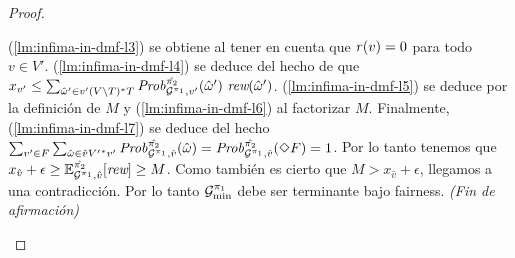 \begin{proof}
\begin{proofofclaim}
    (\ref{lm:infima-in-dmf-l3}) se obtiene al tener en cuenta que $\mathit{r}(v) = 0$ para todo $v \in V'$.
    (\ref{lm:infima-in-dmf-l4}) se deduce del hecho de que 
    $x_{v'} \leq \sum_{\hat{\omega}' \in v' (V \setminus T)^*T}  \MDPProb{\hat{\strat{2}}}_{\StochG^{\strat{1}},v'}(\hat{\omega}')\ \Rewards(\hat{\omega}')$.
    (\ref{lm:infima-in-dmf-l5}) se deduce por la definición de $M$ y
    (\ref{lm:infima-in-dmf-l6}) al factorizar $M$.
    Finalmente, (\ref{lm:infima-in-dmf-l7}) se deduce del hecho 
    $\sum_{v' \in F} \sum_{\hat{\omega} \in \hat{v}{V'}^*v'} \mathit{Prob}^{\hat{\pi_{2}}}_{\mathcal{G}^{\pi_{1}},\hat{v}}(\hat{\omega}) =
    \mathit{Prob}^{\hat{\pi_{2}}}_{\mathcal{G}^{\pi_{1}},\hat{v}} (\Diamond F) = 1$.
    Por lo tanto tenemos que
    $x_{\hat{v}} + \epsilon \geq \mathbb{E}^{\hat{\pi_{2}}}_{\mathcal{G}^{\pi_{1}},\hat{v}}[\textit{rew}] \geq M$.
    Como también es cierto que $M >  x_{\hat{v}} + \epsilon$, llegamos a una contradicción.
    Por lo tanto $\mathcal{G}^{\pi_{1}}_{\min}$ debe ser terminante bajo fairness.
    \hfill\emph{(Fin de afirmación)}\qedhere
  \end{proofofclaim}



\end{proof}
